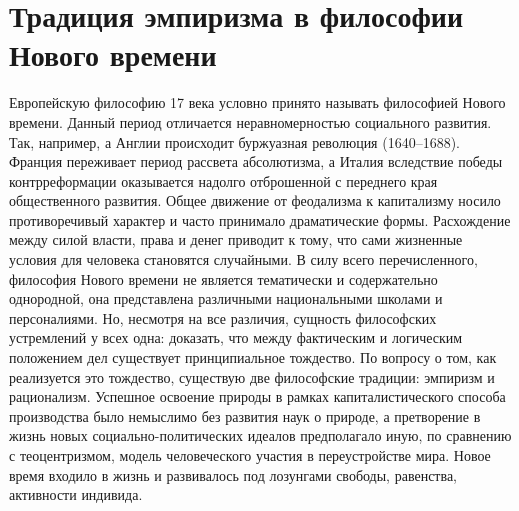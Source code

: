 \documentclass[12pt]{article}
\begin{document}
\section{Традиция эмпиризма в философии Нового времени}
Европейскую философию 17 века условно принято называть философией Нового времени. Данный период
отличается неравномерностью социального развития. Так, например, а Англии происходит буржуазная
революция (1640–1688). Франция переживает период рассвета абсолютизма, а Италия вследствие победы
контрреформации оказывается надолго отброшенной с переднего края общественного развития. Общее
движение от феодализма к капитализму носило противоречивый характер и часто принимало драматические
формы. Расхождение между силой власти, права и денег приводит к тому, что сами жизненные условия для
человека становятся случайными.
В силу всего  перечисленного,  философия  Нового  времени  не  является тематически  и  содержательно
однородной, она представлена различными национальными школами и персоналиями. Но, несмотря на
все различия, сущность философских устремлений у всех одна: доказать, что между фактическим и
логическим положением дел существует принципиальное тождество. По вопросу о том, как реализуется
это тождество, существую две философские традиции: эмпиризм и рационализм.
Успешное  освоение  природы   в   рамках капиталистического способа производства было немыслимо без
развития наук о природе, а претворение в жизнь новых социально-политических идеалов предполагало
иную, по сравнению с теоцентризмом, модель человеческого участия в переустройстве мира. Новое время
входило  в  жизнь  и  развивалось под лозунгами  свободы,  равенства,  активности  индивида.
\end{document}
